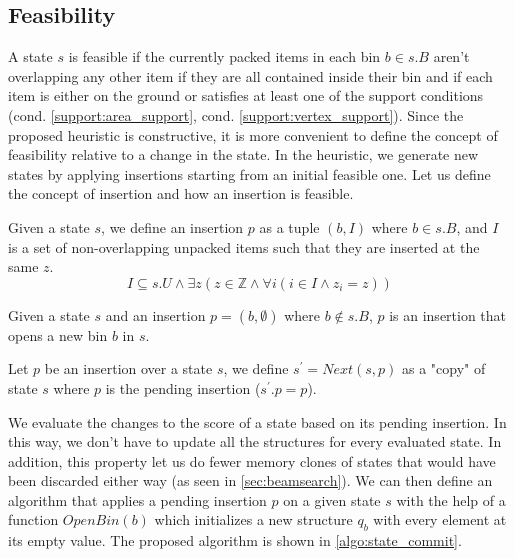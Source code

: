 \subsection{Feasibility}
\label{sec:problem_state:feasibility}%
A state $s$ is feasible if the currently packed items in each bin $b \in s.B$ aren't overlapping any other item if they are all contained inside their bin and if each item is either on the ground or satisfies at least one of the support conditions (cond. \ref{support:area_support}, cond. \ref{support:vertex_support}).
Since the proposed heuristic is constructive, it is more convenient to define the concept of feasibility relative to a change in the state.
In the heuristic, we generate new states by applying insertions starting from an initial feasible one. Let us define the concept of insertion and how an insertion is feasible.

\begin{definition}[Insertion]
    \label{def:insertion}%
    Given a state $s$, we define an insertion $p$ as a tuple $(b, I)$ where $b \in s.B$, and $I$ is a set of non-overlapping unpacked items such that they are inserted at the same $z$.
    \begin{equation*}
        \label{eq:insertion_same_z}
        I \subseteq s.U \land \exists z (z \in \mathbb{Z} \land \forall i ( i \in I \land z_i = z))
    \end{equation*}
\end{definition}
\begin{observation}
    \label{oss:state_bin_open}
    Given a state $s$ and an insertion $p = (b, \emptyset)$ where $b \notin s.B$, $p$ is an insertion that opens a new bin $b$ in $s$.
\end{observation}

\begin{definition}[Next]
    \label{def:state_next}%
    Let $p$ be an insertion over a state $s$, we define $s^\prime = Next(s, p)$ as a "copy" of state $s$ where $p$ is the pending insertion ($s^\prime.p = p$).
\end{definition}

We evaluate the changes to the score of a state based on its pending insertion. 
In this way, we don't have to update all the structures for every evaluated state. 
In addition, this property let us do fewer memory clones of states that would have been discarded either way (as seen in \cref{sec:beamsearch}). 
We can then define an algorithm that applies a pending insertion $p$ on a given state $s$ with the help of a function $OpenBin(b)$ which initializes a new structure $q_b$ with every element at its empty value.
The proposed algorithm is shown in \ref{algo:state_commit}.

